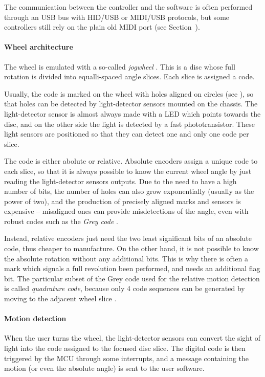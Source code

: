 \documentclass[a4paper,10pt]{article}
\begin{document}
\begin{multicols}{2}
The communication between the controller and the software is often performed through
an USB bus with HID/USB or MIDI/USB protocols, but some controllers still rely on
the plain old MIDI port (see Section~\CITEME).


\paragraph{Wheel architecture}
The wheel is emulated with a so-called \emph{jogwheel} \INSFIG. This is a disc whose full
rotation is divided into equalli-spaced angle slices. Each slice is assigned a code.

Usually, the code is marked on the wheel with holes aligned on circles (see \INSFIG),
so that holes can be detected by light-detector sensors mounted on the chassis.
The light-detector sensor is almost always made with a LED which points towards the
disc, and on the other side the light is detected by a fast phototransistor.
These light sensors are positioned so that they can detect one and only one code per slice.

The code is either abolute or relative. Absolute encoders assign a unique code to each
slice, so that it is always possible to know the current wheel angle by just reading the
light-detector sensors outputs. Due to the need to have a high number of bits, the number
of holes can also grow exponentially (usually as the power of two), and the production of
precisely aligned marks and sensors is expensive -- misaligned ones can provide
misdetections of the angle, even with robust codes such as the \emph{Grey code} \CITEME.

Instead, relative encoders just need the two least significant bits of an absolute code,
thus cheaper to manufacture. On the other hand, it is not possible to know the absolute
rotation without any additional bits. This is why there is often a mark which signals
a full revolution been performed, and needs an additional flag bit. The particular
subset of the Grey code used for the relative motion detection is called \emph{quadrature
code}, because only 4 code sequences can be generated by moving to the adjacent wheel
slice \CITEME.


\paragraph{Motion detection}
When the user turns the wheel, the light-detector sensors can convert the sight of
light into the code assigned to the focused disc slice. The digital code is then
triggered by the MCU through some interrupts, and a message containing the motion (or
even the absolute angle) is sent to the user software.


\end{multicols}
\end{document}
